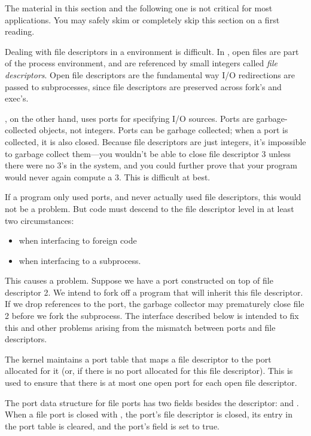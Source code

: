 The material in this section and the following one is not critical for most
applications.
You may safely skim or completely skip this section on a first reading.

Dealing with {\Unix} file descriptors in a {\Scheme} environment is difficult. 
In {\Unix}, open files are part of the process environment, and are referenced
by small integers called \emph{file descriptors}. Open file descriptors are
the fundamental way I/O redirections are passed to subprocesses, since
file descriptors are preserved across fork's and exec's.

{\Scheme}, on the other hand, uses ports for specifying I/O sources. Ports are
garbage-collected {\Scheme} objects, not integers. Ports can be garbage
collected; when a port is collected, it is also closed. Because file
descriptors are just integers, it's impossible to garbage collect them---you
wouldn't be able to close file descriptor 3 unless there were no 3's in the
system, and you could further prove that your program would never again
compute a 3. This is difficult at best.

If a {\Scheme} program only used {\Scheme} ports, and never actually used
file descriptors, this would not be a problem. But {\Scheme} code
must descend to the file descriptor level in at least two circumstances:
%    
\begin{itemize}    
    \item when interfacing to foreign code
    \item when interfacing to a subprocess.
\end{itemize}
%    
This causes a problem. Suppose we have a {\Scheme} port constructed
on top of file descriptor 2. We intend to fork off a program that
will inherit this file descriptor. If we drop references to the port,
the garbage collector may prematurely close file 2 before we fork
the subprocess. The interface described below is intended to fix this and 
other problems arising from the mismatch between ports and file descriptors.

The {\Scheme} kernel maintains a port table that maps a file descriptor
to the {\Scheme} port allocated for it (or, {\sharpf} if there is no port
allocated for this file descriptor). This is used to ensure that
there is at most one open port for each open file descriptor.

The port data structure for file ports has two fields besides the descriptor:
 and . 
When a file port is closed with , 
the port's file descriptor is closed, its entry in the port table is cleared, 
and the port's  field is set to true. 

